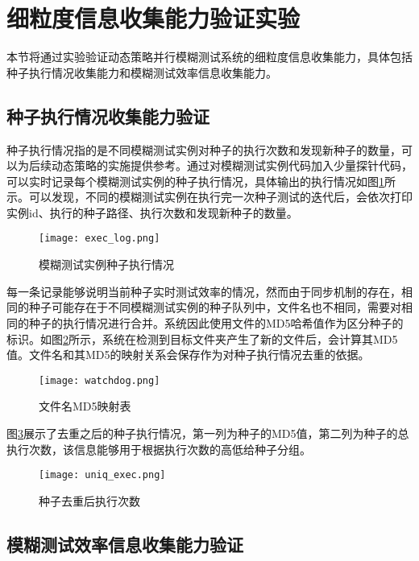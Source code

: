 \documentclass[master]{thesis-uestc}
\begin{document}
\section{细粒度信息收集能力验证实验}
本节将通过实验验证动态策略并行模糊测试系统的细粒度信息收集能力，具体包括种子执行情况收集能力和模糊测试效率信息收集能力。
\subsection{种子执行情况收集能力验证}

种子执行情况指的是不同模糊测试实例对种子的执行次数和发现新种子的数量，可以为后续动态策略的实施提供参考。通过对模糊测试实例代码加入少量探针代码，可以实时记录每个模糊测试实例的种子执行情况，具体输出的执行情况如图\ref{exec_log}所示。可以发现，不同的模糊测试实例在执行完一次种子测试的迭代后，会依次打印实例id、执行的种子路径、执行次数和发现新种子的数量。

\begin{figure}[!htbp]
    \vspace{6pt}
    \centering
    \texttt{[image: exec\_log.png]}
    \caption{模糊测试实例种子执行情况}
    \label{exec_log}
\end{figure}

每一条记录能够说明当前种子实时测试效率的情况，然而由于同步机制的存在，相同的种子可能存在于不同模糊测试实例的种子队列中，文件名也不相同，需要对相同的种子的执行情况进行合并。系统因此使用文件的MD5哈希值作为区分种子的标识。如图\ref{watch_dog}所示，系统在检测到目标文件夹产生了新的文件后，会计算其MD5值。文件名和其MD5的映射关系会保存作为对种子执行情况去重的依据。

\begin{figure}[!htbp]
    \vspace{6pt}
    \centering
    \texttt{[image: watchdog.png]}
    \caption{文件名MD5映射表}
    \label{watch_dog}
\end{figure}

图\ref{uniq_exec}展示了去重之后的种子执行情况，第一列为种子的MD5值，第二列为种子的总执行次数，该信息能够用于根据执行次数的高低给种子分组。

\begin{figure}[!htbp]
    \vspace{6pt}
    \centering
    \texttt{[image: uniq\_exec.png]}
    \caption{种子去重后执行次数}
    \label{uniq_exec}
\end{figure}

\subsection{模糊测试效率信息收集能力验证}
\end{document}
